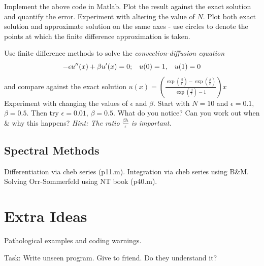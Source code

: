 \documentclass[12pt]{report}
\begin{document}
\begin{itemize}
\begin{tcolorbox}[title=Task]
Implement the above code in Matlab. Plot the result against the exact solution and quantify the error. Experiment with altering the value of $N$. Plot both exact solution and approximate solution on the same axes - use circles to denote the points at which the finite difference approximation is taken.
\end{tcolorbox}

\begin{tcolorbox}[title=Task]
Use finite difference methods to solve the \textit{convection-diffusion equation}
\begin{displaymath}
-\epsilon u''(x) + \beta u'(x) = 0; \hspace{3mm} u(0) = 1, \hspace{3mm} u(1) = 0
\end{displaymath}
and compare against the exact solution $u(x) = \left(\frac{\exp\left(\frac{\beta}{\epsilon}\right)-\exp\left(\frac{\beta}{\epsilon}\right)}{\exp\left(\frac{\beta}{\epsilon}\right)-1}\right)x$
\tcblower
Experiment with changing the values of $\epsilon$ and $\beta$. Start with $N=10$ and $\epsilon = 0.1$, $\beta = 0.5$. Then try $\epsilon = 0.01$, $\beta = 0.5$. What do you notice? Can you work out when \& why this happens? \textit{Hint: The ratio $\frac{\beta h}{\epsilon}$ is important}.
\end{tcolorbox}

\end{itemize}

\subsection*{Spectral Methods}

Differentiation via cheb series (p11.m).
Integration via cheb series using B\&M.
Solving Orr-Sommerfeld using NT book (p40.m).

\section*{Extra Ideas}

Pathological examples and coding warnings.

Task: Write unseen program. Give to friend. Do they understand it?
\end{document}
